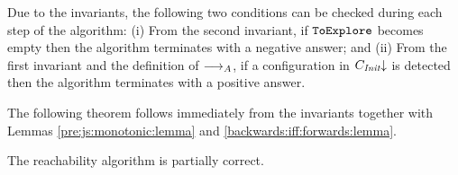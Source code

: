 
Due to the invariants, the following two conditions can be checked
during each step of the algorithm:
(i)
  From the second invariant, if ${\tt ToExplore}$ becomes empty then the
  algorithm terminates with a negative answer; and
(ii)
  From the first invariant and the definition of $\stackrel{}{\longrightarrow}_A$, if a
  configuration in $C_{\it Init}\!\!\downarrow$ is detected then the algorithm
  terminates with a positive answer.

%
The following theorem follows immediately from the invariants together
with Lemmas \ref{pre:js:monotonic:lemma} and \ref{backwards:iff:forwards:lemma}.
%
\begin{theorem}
\label{partial:correctness:algorithm}
The reachability algorithm is partially correct.
\end{theorem}



